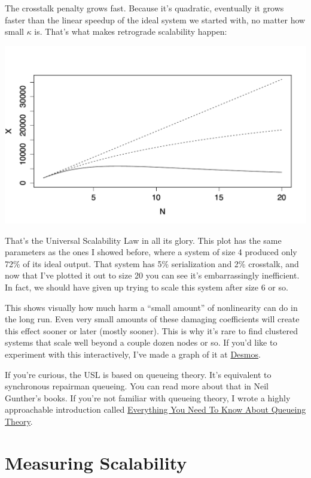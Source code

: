 \documentclass{vivid_layout}
\begin{document}
The crosstalk penalty grows fast. Because it's quadratic, eventually it grows
faster than the linear speedup of the ideal system we started with, no matter
how small $\kappa$ is.  That's what makes retrograde scalability happen:
\begin{center}
\includegraphics[width=.85\linewidth]{scalability/usl}
\end{center}

That's the Universal Scalability Law in all its glory.  This plot has the same
parameters as the ones I showed before, where a system of size 4 produced only
72\% of its ideal output. That system has 5\% serialization and 2\% crosstalk,
and now that I've plotted it out to size 20 you can see it's embarrassingly
inefficient.  In fact, we should have given up trying to scale this system after
size 6 or so.

This shows visually how much harm a ``small amount'' of nonlinearity can do in
the long run.  Even very small amounts of these damaging coefficients will
create this effect sooner or later (mostly sooner). This is why it's rare to
find clustered systems that scale well beyond a couple dozen nodes or so.
If you'd like to experiment with this interactively, I've made a graph of it at
\href{https://www.desmos.com/calculator/2l0jcjmsxn}{Desmos}.

If you're curious, the USL is based on queueing theory. It's equivalent to
synchronous repairman queueing. You can read more about that in Neil Gunther's
books. If you're not familiar with queueing theory, I wrote a highly
approachable introduction called
\href{https://www.vividcortex.com/resources/queueing-theory/}{Everything You
Need To Know About Queueing Theory}.

\section{Measuring Scalability}
\end{document}
